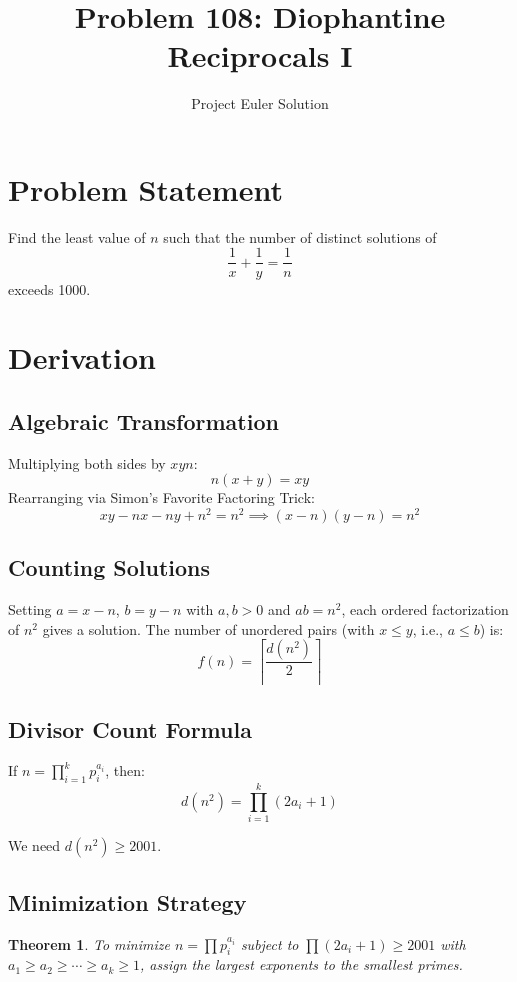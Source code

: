 \documentclass[12pt,a4paper]{article}
\title{Problem 108: Diophantine Reciprocals I}
\author{Project Euler Solution}
\date{}
\newtheorem{theorem}{Theorem}
\theoremstyle{definition}
\begin{document}
\maketitle

\section{Problem Statement}

Find the least value of $n$ such that the number of distinct solutions of
\[
\frac{1}{x} + \frac{1}{y} = \frac{1}{n}
\]
exceeds 1000.

\section{Derivation}

\subsection{Algebraic Transformation}

Multiplying both sides by $xyn$:
\[
n(x + y) = xy
\]
Rearranging via Simon's Favorite Factoring Trick:
\[
xy - nx - ny + n^2 = n^2 \implies (x-n)(y-n) = n^2
\]

\subsection{Counting Solutions}

Setting $a = x - n$, $b = y - n$ with $a, b > 0$ and $ab = n^2$, each ordered factorization of $n^2$ gives a solution. The number of unordered pairs (with $x \leq y$, i.e., $a \leq b$) is:
\[
f(n) = \left\lceil \frac{d(n^2)}{2} \right\rceil
\]

\subsection{Divisor Count Formula}

If $n = \prod_{i=1}^{k} p_i^{a_i}$, then:
\[
d(n^2) = \prod_{i=1}^{k} (2a_i + 1)
\]

We need $d(n^2) \geq 2001$.

\subsection{Minimization Strategy}

\begin{theorem}
To minimize $n = \prod p_i^{a_i}$ subject to $\prod (2a_i + 1) \geq 2001$ with $a_1 \geq a_2 \geq \cdots \geq a_k \geq 1$, assign the largest exponents to the smallest primes.
\end{theorem}
\end{document}
